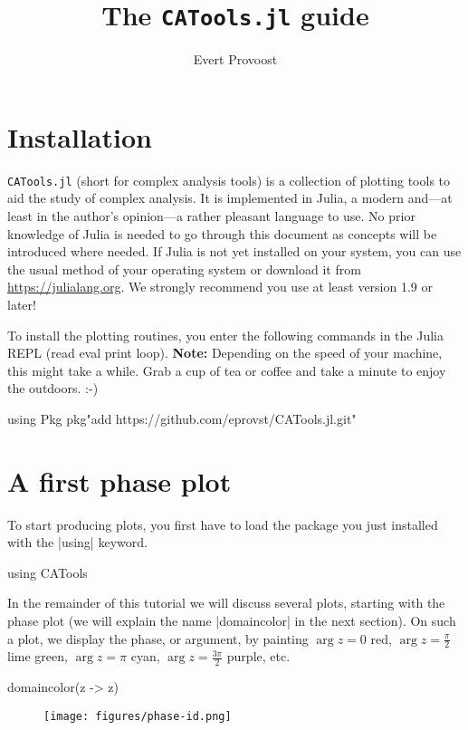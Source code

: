 \documentclass[a4paper]{article}
\title{\vspace*{-1em}The \texttt{CATools.jl} guide}
\author{Evert Provoost}
\date{}
\begin{document}
\maketitle

\section{Installation}

\texttt{CATools.jl} (short for complex analysis tools) is a collection of
plotting tools to aid the study of complex analysis. It is implemented in Julia,
a modern and---at least in the author's opinion---a rather pleasant language to
use.  No prior knowledge of Julia is needed to go through this document as
concepts will be introduced where needed. If Julia is not yet installed on your
system, you can use the usual method of your operating system or download it
from \url{https://julialang.org}. We strongly recommend you use at least version
1.9 or later!

To install the plotting routines, you enter the following commands in the Julia
REPL (read eval print loop).  \textbf{Note:} Depending on the speed of your
machine, this might take a while. Grab a cup of tea or coffee and take a minute
to enjoy the outdoors. :-)

\begin{juliaverbatim}
	using Pkg
	pkg"add https://github.com/eprovst/CATools.jl.git"
\end{juliaverbatim}

\section{A first phase plot}

To start producing plots, you first have to load the package you just installed
with the \jlv|using| keyword.

\begin{juliaverbatim}
	using CATools
\end{juliaverbatim}

In the remainder of this tutorial we will discuss several plots, starting with
the phase plot (we will explain the name \jlv|domaincolor| in the next
section). On such a plot, we display the phase, or argument, by painting
$\arg z = 0$ red, $\arg z = \frac{\pi}{2}$ lime green, $\arg z = \pi$ cyan,
$\arg z = \frac{3\pi}{2}$ purple, etc.

\begin{juliaverbatim}
	domaincolor(z -> z)
\end{juliaverbatim}
\begin{figure}[H]
	\centering
	\texttt{[image: figures/phase-id.png]}
\end{figure}
\end{document}
